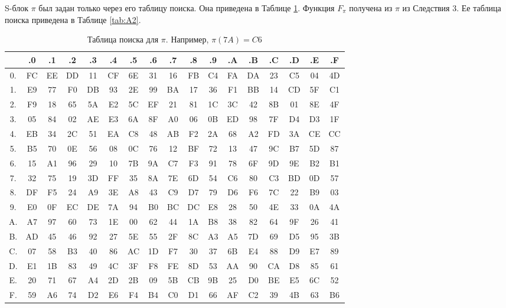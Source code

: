 
S-блок $\pi$ был задан только через его таблицу поиска. Она приведена в Таблице \ref{tab:A1}. Функция $F_{\pi}$ получена из $\pi$ из Следствия 3. Ее таблица поиска приведена в Таблице \ref{tab:A2}.

\begin{table}
        \small
        \centering
        \begin{tabular}{c|cccccccccccccccc}
                & .0 & .1 & .2 & .3 & .4 & .5 & .6 & .7 & .8 & .9 & .A & .B & .C & .D & .E & .F \\ \hline
        0. & FC & EE & DD & 11 & CF & 6E & 31 & 16 & FB & C4 & FA & DA & 23 & C5 & 04 & 4D \\
        1. & E9 & 77 & F0 & DB & 93 & 2E & 99 & BA & 17 & 36 & F1 & BB & 14 & CD & 5F & C1 \\
        2. & F9 & 18 & 65 & 5A & E2 & 5C & EF & 21 & 81 & 1C & 3C & 42 & 8B & 01 & 8E & 4F \\
        3. & 05 & 84 & 02 & AE & E3 & 6A & 8F & A0 & 06 & 0B & ED & 98 & 7F & D4 & D3 & 1F \\
        4. & EB & 34 & 2C & 51 & EA & C8 & 48 & AB & F2 & 2A & 68 & A2 & FD & 3A & CE & CC \\
        5. & B5 & 70 & 0E & 56 & 08 & 0C & 76 & 12 & BF & 72 & 13 & 47 & 9C & B7 & 5D & 87 \\
        6. & 15 & A1 & 96 & 29 & 10 & 7B & 9A & C7 & F3 & 91 & 78 & 6F & 9D & 9E & B2 & B1 \\
        7. & 32 & 75 & 19 & 3D & FF & 35 & 8A & 7E & 6D & 54 & C6 & 80 & C3 & BD & 0D & 57 \\
        8. & DF & F5 & 24 & A9 & 3E & A8 & 43 & C9 & D7 & 79 & D6 & F6 & 7C & 22 & B9 & 03 \\
        9. & E0 & 0F & EC & DE & 7A & 94 & B0 & BC & DC & E8 & 28 & 50 & 4E & 33 & 0A & 4A \\
        A. & A7 & 97 & 60 & 73 & 1E & 00 & 62 & 44 & 1A & B8 & 38 & 82 & 64 & 9F & 26 & 41 \\
        B. & AD & 45 & 46 & 92 & 27 & 5E & 55 & 2F & 8C & A3 & A5 & 7D & 69 & D5 & 95 & 3B \\
        C. & 07 & 58 & B3 & 40 & 86 & AC & 1D & F7 & 30 & 37 & 6B & E4 & 88 & D9 & E7 & 89 \\
        D. & E1 & 1B & 83 & 49 & 4C & 3F & F8 & FE & 8D & 53 & AA & 90 & CA & D8 & 85 & 61 \\
        E. & 20 & 71 & 67 & A4 & 2D & 2B & 09 & 5B & CB & 9B & 25 & D0 & BE & E5 & 6C & 52 \\
        F. & 59 & A6 & 74 & D2 & E6 & F4 & B4 & C0 & D1 & 66 & AF & C2 & 39 & 4B & 63 & B6 \\
        \end{tabular}
        \caption{Таблица поиска для \(\pi\). Например, \(\pi(7A)=C6\)}
        \label{tab:A1}
\end{table}

